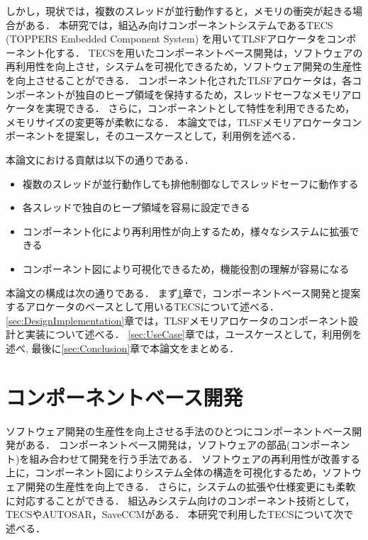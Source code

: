 \documentclass[submit,techrep]{ipsj_v2/UTF8/ipsj}
\begin{document}
しかし，現状では，複数のスレッドが並行動作すると，メモリの衝突が起きる場合がある．
本研究では，組込み向けコンポーネントシステムであるTECS (TOPPERS Embedded Component System)\cite{url:TECS}\cite{par:TECS} を用いてTLSFアロケータをコンポーネント化する．
TECSを用いたコンポーネントベース開発は，ソフトウェアの再利用性を向上させ，システムを可視化できるため，ソフトウェア開発の生産性を向上させることができる．
コンポーネント化されたTLSFアロケータは，各コンポーネントが独自のヒープ領域を保持するため，スレッドセーフなメモリアロケータを実現できる．
さらに，コンポーネントとして特性を利用できるため，メモリサイズの変更等が柔軟になる．
本論文では，TLSFメモリアロケータコンポーネントを提案し，そのユースケースとして，利用例を述べる．

本論文における貢献は以下の通りである．
\begin{itemize}
    \item 複数のスレッドが並行動作しても排他制御なしでスレッドセーフに動作する
    \item 各スレッドで独自のヒープ領域を容易に設定できる
    \item コンポーネント化により再利用性が向上するため，様々なシステムに拡張できる
    \item コンポーネント図により可視化できるため，機能役割の理解が容易になる
\end{itemize}

本論文の構成は次の通りである．
まず\ref{sec:ComponentBasedDevelopment}章で，コンポーネントベース開発と提案するアロケータのベースとして用いるTECSについて述べる．
\ref{sec:DesignImplementation}章では，TLSFメモリアロケータのコンポーネント設計と実装について述べる．
\ref{sec:UseCase}章では，ユースケースとして，利用例を述べ, 最後に\ref{sec:Conclusion}章で本論文をまとめる．

\section{コンポーネントベース開発}
\label{sec:ComponentBasedDevelopment}

ソフトウェア開発の生産性を向上させる手法のひとつにコンポーネントベース開発がある\cite{par:Crnkovic}\cite{par:CBD}．
コンポーネントベース開発は，ソフトウェアの部品(コンポーネント)を組み合わせて開発を行う手法である．
ソフトウェアの再利用性が改善する上に，コンポーネント図によりシステム全体の構造を可視化するため，ソフトウェア開発の生産性を向上できる．
さらに，システムの拡張や仕様変更にも柔軟に対応することができる．
組込みシステム向けのコンポーネント技術として，TECSやAUTOSAR\cite{url:AUTOSAR}，SaveCCM\cite{par:SAVEapproach}がある．
本研究で利用したTECSについて次で述べる．
\end{document}

